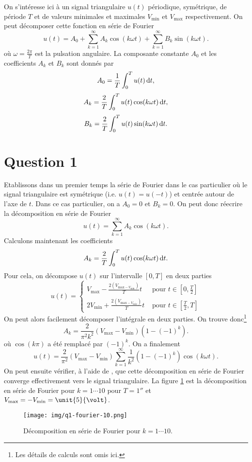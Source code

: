 

On s'intéresse ici à un signal triangulaire $u(t)$
périodique, symétrique, de période $T$ et de valeurs 
minimales et maximales $V_{\text{min}}$ et $V_{\text{max}}$
respectivement. On peut décomposer cette fonction
en série de Fourier
\[ u(t) = A_0 + \sum_{k=1}^{\infty} A_k\cos(k\omega t)
+ \sum_{k=1}^{\infty} B_k\sin(k\omega t). \]
où $\omega = \frac{2\pi}{T}$ est la pulsation angulaire.
La composante constante $A_0$ et les coefficients $A_k$
et $B_k$ sont donnés par 
\[ A_0 = \frac{1}{T} \int_0^T u(t)\operatorname{d}\! t,\]
\[ A_k = \frac{2}{T} \int_0^T u(t)\cos(k\omega t)\operatorname{d}\! t,\]
\[ B_k = \frac{2}{T} \int_0^T u(t)\sin(k\omega t)\operatorname{d}\! t.\]

\section{Question 1}
Etablissons dans un premier temps la série de Fourier
dans le cas particulier où le signal triangulaire
est symétrique (i.e. $u(t) = u(-t)$) et centrée autour
de l'axe de $t$. Dans ce cas particulier, on a $A_0 = 0$
et $B_k = 0$. On peut donc réecrire la décomposition
en série de Fourier 
\[ u(t) = \sum_{k=1}^{\infty} A_k\cos(k\omega t).\]
Calculons maintenant les coefficients
\[ A_k = \frac{2}{T} \int_0^T u(t)\cos(k\omega t)\operatorname{d}\! t.\]
Pour cela, on décompose $u(t)$ sur l'intervalle $[0,T]$
en deux parties
\[ u(t) =
	\left\{
		\begin{array}{rl}
			V_{\text{max}} - \frac{2(V_{\text{max}-V_{\text{min}}})}{T}t 	
			&\text{ pour } t \in [0,\frac{T}{2}]  \\
			2V_{\text{min}} + \frac{2(V_{\text{max}-V_{\text{min}}})}{T}t 
			&\text{ pour }t \in [\frac{T}{2},T] 
		\end{array}
	\right.
\]
On peut alors facilement décomposer l'intégrale en deux
parties. On trouve donc\footnote{Les détails
de calculs sont omis ici.}
\[ A_k = \frac{2}{\pi^2k^2}(V_{\text{max}}-V_{\text{min}})
(1 - (-1)^k).\]
où $\cos(k\pi)$ a été remplacé par $(-1)^k$.
On a finalement
\[ u(t) = \frac{2}{\pi^2}(V_{\text{max}}-V_{\text{min}})
\sum_{k=1}^{\infty} \frac{1}{k^2}(1 - (-1)^k)\cos(k\omega t).\]
On peut ensuite vérifier, à l'aide de \matlab,
que cette décomposition en série de Fourier
converge effectivement vers le signal triangulaire.
La figure \ref{fig:q1-fourier-10} est la décomposition
en série de Fourier pour $k = 1\cdots10$ pour 
$T = \unit{1}{\second}$ et $V_{\text{max}} = 
-V_{\text{min}} = \unit{5}{\volt}$.

\begin{figure}[ht]
	\centering
	\texttt{[image: img/q1-fourier-10.png]}
	\caption{Décomposition en série de Fourier pour $k=1\cdots10$.}
	\label{fig:q1-fourier-10}
\end{figure}


